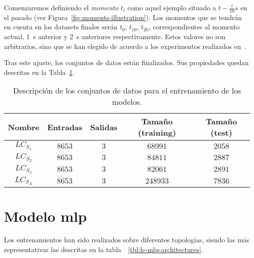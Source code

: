 Comenzaremos definiendo el \textit{momento} $t_i$ como aquel ejemplo situado a $t - \frac{i}{10}s$ en el pasado (ver Figura~\ref{fig:moments-illustration}). Los momentos que se tendrán en cuenta en los datasets finales serán $t_0$, $t_10$, $t_20$, correspondientes al momento actual, \SI{1}{\second} anterior y \SI{2}{\second} anteriores respectivamente. Estos valores no son arbitrarios, sino que se han elegido de acuerdo a los experimentos realizados en~\cite{EL PAPER CUANDO NOS LO PUBLIQUEN}.

Tras este ajuste, los conjuntos de datos están finalizados. Sus propiedades quedan descritas en la Tabla~\ref{tbl:lc-datasets-description}.

\begin{table}
	\caption[Descripción de los conjuntos de datos]{Descripción de los conjuntos de datos para el entrenamiento de los modelos.}
	\label{tbl:lc-datasets-description}
	\begin{tabular}{ccccc}
		\toprule
		Nombre & Entradas & Salidas & Tamaño (training) & Tamaño (test) \\
		\midrule
		$LC_{S_1}$ & $8653$ & $3$ & $68991$ & $2058$ \\
		$LC_{S_2}$ & $8653$ & $3$ & $84811$ & $2887$ \\
		$LC_{S_3}$ & $8653$ & $3$ & $82061$ & $2891$ \\
		$LC_{S_A}$ & $8653$ & $3$ & $248933$ & $7836$ \\
		\bottomrule
	\end{tabular}
\end{table}

\section{Modelo \ac{mlp}}

Los entrenamientos han sido realizados sobre diferentes topologías, siendo las más representativas las descritas en la tabla~~\ref{tbl:lc-mlp-architectures}.


